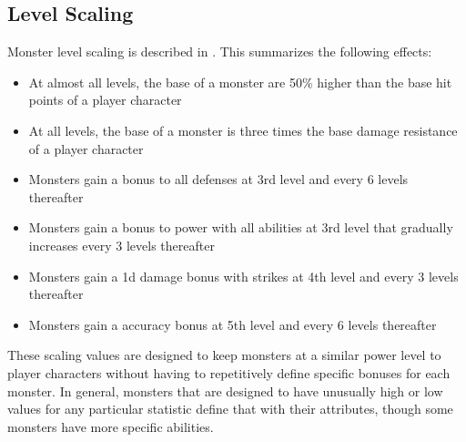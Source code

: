     \subsection{Level Scaling}
        Monster level scaling is described in .
        This summarizes the following effects:
        \begin{itemize}
            \item At almost all levels, the base  of a monster are 50\% higher than the base hit points of a player character
            \item At all levels, the base  of a monster is three times the base damage resistance of a player character
            \item Monsters gain a  bonus to all defenses at 3rd level and every 6 levels thereafter
            \item Monsters gain a  bonus to power with all abilities at 3rd level that gradually increases every 3 levels thereafter
            \item Monsters gain a \plus1d damage bonus with strikes at 4th level and every 3 levels thereafter
            \item Monsters gain a  accuracy bonus at 5th level and every 6 levels thereafter
        \end{itemize}
        These scaling values are designed to keep monsters at a similar power level to player characters without having to repetitively define specific bonuses for each monster.
        In general, monsters that are designed to have unusually high or low values for any particular statistic define that with their attributes, though some monsters have more specific abilities.

